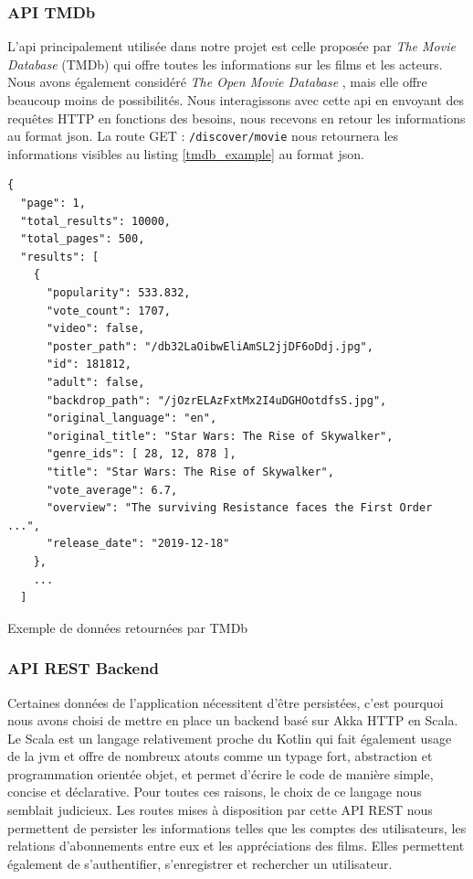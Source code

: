 \subsubsection{API TMDb}
L'\acrshort{api} principalement utilisée dans notre projet est celle proposée par \textit{The Movie Database} (TMDb) \cite{tmdb} qui offre toutes les informations sur les films et les acteurs. Nous avons également considéré \textit{The Open Movie Database} \cite{omdb}, mais elle offre beaucoup moins de possibilités. Nous interagissons avec cette \acrshort{api} en envoyant des requêtes HTTP en fonctions des besoins, nous recevons en retour les informations au format \acrshort{json}. La route GET : \texttt{/discover/movie} nous retournera les informations visibles au listing \ref{tmdb_example} au format \acrshort{json}.
\bigbreak
\begin{code}
    \begin{verbatim}
{
  "page": 1,
  "total_results": 10000,
  "total_pages": 500,
  "results": [
    {
      "popularity": 533.832,
      "vote_count": 1707,
      "video": false,
      "poster_path": "/db32LaOibwEliAmSL2jjDF6oDdj.jpg",
      "id": 181812,
      "adult": false,
      "backdrop_path": "/jOzrELAzFxtMx2I4uDGHOotdfsS.jpg",
      "original_language": "en",
      "original_title": "Star Wars: The Rise of Skywalker",
      "genre_ids": [ 28, 12, 878 ],
      "title": "Star Wars: The Rise of Skywalker",
      "vote_average": 6.7,
      "overview": "The surviving Resistance faces the First Order ...",
      "release_date": "2019-12-18"
    },
    ...
  ]
    \end{verbatim}
    \caption{Exemple de données retournées par TMDb}
    \label{tmdb_example}
\end{code}
\bigbreak

\subsubsection{API REST Backend}
Certaines données de l'application nécessitent d'être persistées, c'est pourquoi nous avons choisi de mettre en place un backend basé sur Akka HTTP \cite{akka} en Scala. Le Scala est un langage relativement proche du Kotlin qui fait également usage de la \acrshort{jvm} et offre de nombreux atouts comme un typage fort, abstraction et programmation orientée objet, et permet d'écrire le code de manière simple, concise et déclarative. Pour toutes ces raisons, le choix de ce langage nous semblait judicieux. Les routes mises à disposition par cette API REST nous permettent de persister les informations telles que les comptes des utilisateurs, les relations d'abonnements entre eux et les appréciations des films. Elles permettent également de s'authentifier, s'enregistrer et rechercher un utilisateur.

